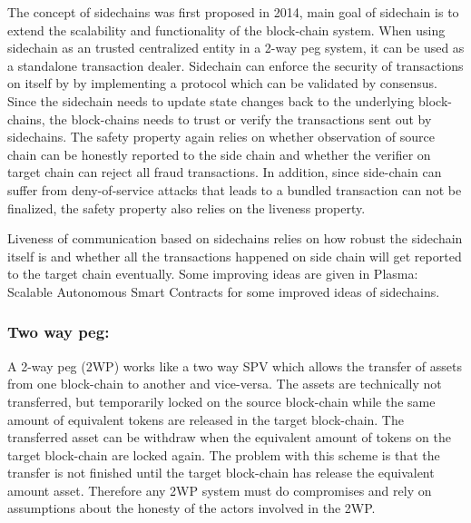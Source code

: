 \documentclass[acmtog, natbib=false]{acmart}
\begin{document}
    The concept of sidechains was first proposed in 2014, main goal of sidechain is to extend the scalability and functionality of the block-chain system. When using sidechain as an trusted centralized entity in a 2-way peg system, it can be used as a standalone transaction dealer. 
    Sidechain can enforce the security of transactions on itself by by implementing a protocol which can be validated by consensus. Since the sidechain needs to update state changes back to the underlying block-chains, the block-chains needs to trust or verify the transactions sent out by sidechains. The safety property again relies on whether observation of source chain can be honestly reported to the side chain and whether the verifier on target chain can reject all fraud transactions. In addition, since side-chain can suffer from deny-of-service attacks that leads to a bundled transaction can not be finalized, the safety property also relies on the liveness property.

    Liveness of communication based on sidechains relies on how robust the sidechain itself is and whether all the transactions happened on side chain will get reported to the target chain eventually. Some improving ideas are given in Plasma: Scalable Autonomous Smart Contracts for some improved ideas of sidechains.


\subsubsection{Two way peg:}
    A 2-way peg (2WP) works like a two way SPV which allows the transfer of assets from one block-chain to another and vice-versa. The assets are technically not transferred, but temporarily locked on the source block-chain while the same amount of equivalent tokens are released in the target block-chain. The transferred asset can be withdraw when the equivalent amount of tokens on the target block-chain are locked again. The problem with this scheme is that the transfer is not finished until the target block-chain has release the equivalent amount asset. Therefore any 2WP system must do compromises and rely on assumptions about the honesty of the actors involved in the 2WP.
\end{document}
